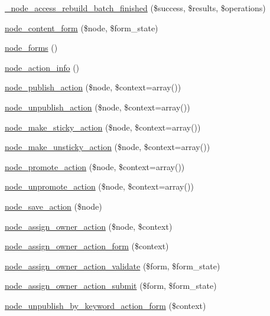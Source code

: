 \begin{DoxyCompactItemize}
\item 
\hyperlink{group__node__access_gaa7feee934ce635e386628b570901ff38}{\_\-node\_\-access\_\-rebuild\_\-batch\_\-finished} (\$success, \$results, \$operations)
\item 
\hyperlink{group__node__content_ga5f8f7253ba1bd773e4032546e9241983}{node\_\-content\_\-form} (\$node, \$form\_\-state)
\item 
\hyperlink{node_8module_aeb7774b7406a9dcba3c7f587a520df31}{node\_\-forms} ()
\item 
\hyperlink{node_8module_a684fb56e46d0090df253d784e6403f35}{node\_\-action\_\-info} ()
\item 
\hyperlink{group__actions_gadf8322ab430e3fb9cbb7e84db47b744f}{node\_\-publish\_\-action} (\$node, \$context=array())
\item 
\hyperlink{group__actions_ga93d63f63526d64026ebdd5fc6572f5ab}{node\_\-unpublish\_\-action} (\$node, \$context=array())
\item 
\hyperlink{group__actions_ga73254d8abc7dfa53cd2259230bd5246a}{node\_\-make\_\-sticky\_\-action} (\$node, \$context=array())
\item 
\hyperlink{group__actions_gab04ec5d42febda8ef49715c27c4ad126}{node\_\-make\_\-unsticky\_\-action} (\$node, \$context=array())
\item 
\hyperlink{group__actions_ga5e48e8fd6348bdc8e826b84446ed2c0d}{node\_\-promote\_\-action} (\$node, \$context=array())
\item 
\hyperlink{group__actions_ga8f13fd18828b94e3736a39264149f927}{node\_\-unpromote\_\-action} (\$node, \$context=array())
\item 
\hyperlink{group__actions_ga84f5af7da5d6f9161307f61e8b345bce}{node\_\-save\_\-action} (\$node)
\item 
\hyperlink{group__actions_ga35a1ee4e6845f1031ef84ef787252efd}{node\_\-assign\_\-owner\_\-action} (\$node, \$context)
\item 
\hyperlink{group__forms_ga427eee96a0ab2c2048a39fafcb6c4173}{node\_\-assign\_\-owner\_\-action\_\-form} (\$context)
\item 
\hyperlink{node_8module_a85a0ccfdb35dae02fed98ec3c3498c85}{node\_\-assign\_\-owner\_\-action\_\-validate} (\$form, \$form\_\-state)
\item 
\hyperlink{node_8module_a777bb331cf28f580e2a3030d95d9f254}{node\_\-assign\_\-owner\_\-action\_\-submit} (\$form, \$form\_\-state)
\item 
\hyperlink{node_8module_af8e8ad9a0d7070eb2c653634fee434cc}{node\_\-unpublish\_\-by\_\-keyword\_\-action\_\-form} (\$context)

\end{DoxyCompactItemize}
